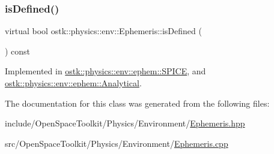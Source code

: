 \subsubsection{\texorpdfstring{is\+Defined()}{isDefined()}}
{\footnotesize\ttfamily virtual bool ostk\+::physics\+::env\+::\+Ephemeris\+::is\+Defined (\begin{DoxyParamCaption}{ }\end{DoxyParamCaption}) const\hspace{0.3cm}{\ttfamily [pure virtual]}}



Implemented in \hyperlink{classostk_1_1physics_1_1env_1_1ephem_1_1_s_p_i_c_e_a2e5350a46c5efe938998b760ee783f77}{ostk\+::physics\+::env\+::ephem\+::\+S\+P\+I\+CE}, and \hyperlink{classostk_1_1physics_1_1env_1_1ephem_1_1_analytical_ac832a4552abfbeba38891cb936bc15ef}{ostk\+::physics\+::env\+::ephem\+::\+Analytical}.



The documentation for this class was generated from the following files\+:\begin{DoxyCompactItemize}
\item 
include/\+Open\+Space\+Toolkit/\+Physics/\+Environment/\hyperlink{_ephemeris_8hpp}{Ephemeris.\+hpp}\item 
src/\+Open\+Space\+Toolkit/\+Physics/\+Environment/\hyperlink{_ephemeris_8cpp}{Ephemeris.\+cpp}\end{DoxyCompactItemize}

